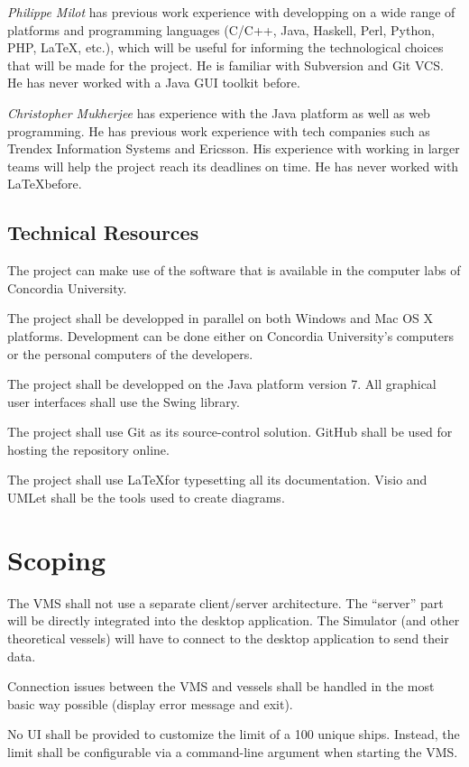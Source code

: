 \documentclass{article}
\begin{document}
\emph{Philippe Milot} has previous work experience with developping on a wide range of platforms and programming languages (C/C++, Java, Haskell, Perl, Python, PHP, \LaTeX, etc.), which will be useful for informing the technological choices that will be made for the project. He is familiar with Subversion and Git VCS. He has never worked with a Java GUI toolkit before.

\emph{Christopher Mukherjee} has experience with the Java platform as well as web programming. He has previous work experience with tech companies such as Trendex Information Systems and Ericsson. His experience with working in larger teams will help the project reach its deadlines on time. He has never worked with \LaTeX before.

\subsection{Technical Resources} %

The project can make use of the software that is available in the computer labs of Concordia University. 

The project shall be developped in parallel on both Windows and Mac OS X platforms. Development can be done either on Concordia University's computers or the personal computers of the developers.

The project shall be developped on the Java platform version 7. All graphical user interfaces shall use the Swing library.

The project shall use Git as its source-control solution. GitHub shall be used for hosting the repository online.

The project shall use \LaTeX for typesetting all its documentation. Visio and UMLet shall be the tools used to create diagrams.

\section{Scoping} %
The VMS shall not use a separate client/server architecture. The ``server'' part will be directly integrated into the desktop application. The Simulator (and other theoretical vessels) will have to connect to the desktop application to send their data.

Connection issues between the VMS and vessels shall be handled in the most basic way possible (display error message and exit).

No UI shall be provided to customize the limit of a 100 unique ships. Instead, the limit shall be configurable via a command-line argument when starting the VMS. 
\end{document}
